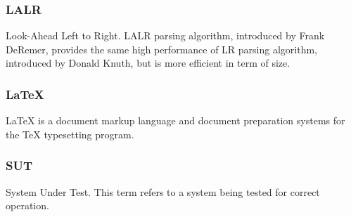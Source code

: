 \subsubsection*{LALR}

Look-Ahead Left to Right. LALR parsing algorithm, introduced by Frank DeRemer, provides the same high performance of LR parsing algorithm, introduced by Donald Knuth, but is more efficient in term of size.

\subsubsection*{LaTeX}

LaTeX is a document markup language and document preparation systems for the TeX typesetting program.

\subsubsection*{SUT}

System Under Test. This term refers to a system being tested for correct operation.

